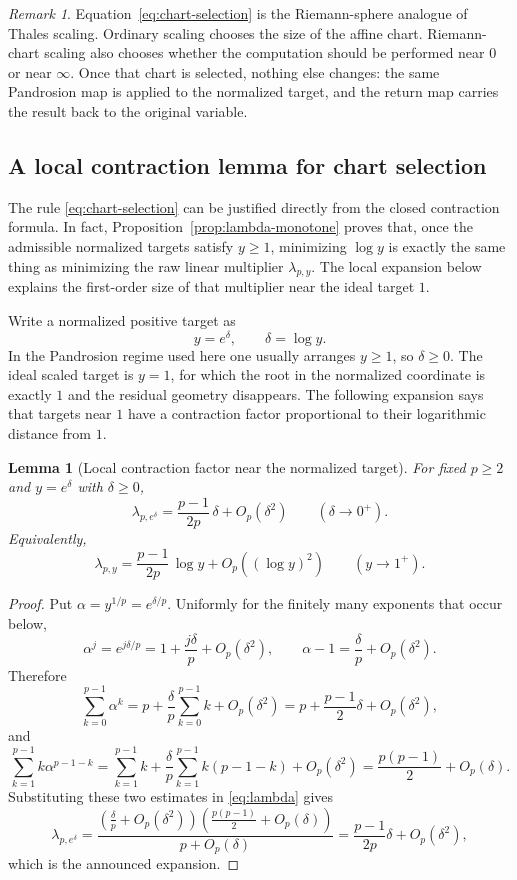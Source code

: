 \documentclass[10pt,a4paper]{article}
\theoremstyle{plain}
\newtheorem{lemma}[theorem]{Lemma}
\theoremstyle{definition}
\theoremstyle{remark}
\newtheorem{remark}[theorem]{Remark}
\begin{document}
\begin{remark}
Equation~\eqref{eq:chart-selection} is the Riemann-sphere analogue of Thales
scaling.  Ordinary scaling chooses the size of the affine chart.  Riemann-chart
scaling also chooses whether the computation should be performed near $0$ or
near $\infty$.  Once that chart is selected, nothing else changes: the same
Pandrosion map is applied to the normalized target, and the return map carries
the result back to the original variable.
\end{remark}


\subsection{A local contraction lemma for chart selection}
\label{subsec:chart-contraction-lemma}

The rule \eqref{eq:chart-selection} can be justified directly from the closed
contraction formula.  In fact, Proposition~\ref{prop:lambda-monotone} proves
that, once the admissible normalized targets satisfy $y\ge1$, minimizing
$\log y$ is exactly the same thing as minimizing the raw linear multiplier
$\lambda_{p,y}$.  The local expansion below explains the first-order size of
that multiplier near the ideal target $1$.

Write a normalized positive target as
\[
  y=e^\delta,
  \qquad \delta=\log y.
\]
In the Pandrosion regime used here one usually arranges $y\ge 1$, so
$\delta\ge0$.  The ideal scaled target is $y=1$, for which the root in the
normalized coordinate is exactly $1$ and the residual geometry disappears.
The following expansion says that targets near $1$ have a contraction factor
proportional to their logarithmic distance from $1$.

\begin{lemma}[Local contraction factor near the normalized target]
\label{lem:local-chart-contraction}
For fixed $p\ge2$ and $y=e^\delta$ with $\delta\ge0$,
\[
  \lambda_{p,e^\delta}
  =\frac{p-1}{2p}\,\delta+O_p(\delta^2)
  \qquad(\delta\to0^+).
\]
Equivalently,
\[
  \lambda_{p,y}
  =\frac{p-1}{2p}\,\log y+O_p((\log y)^2)
  \qquad(y\to1^+).
\]
\end{lemma}

\begin{proof}
Put $\alpha=y^{1/p}=e^{\delta/p}$.  Uniformly for the finitely many exponents
that occur below,
\[
  \alpha^j=e^{j\delta/p}
  =1+\frac{j\delta}{p}+O_p(\delta^2),
  \qquad
  \alpha-1=\frac{\delta}{p}+O_p(\delta^2).
\]
Therefore
\[
  \sum_{k=0}^{p-1}\alpha^k
  =p+\frac{\delta}{p}\sum_{k=0}^{p-1}k+O_p(\delta^2)
  =p+\frac{p-1}{2}\delta+O_p(\delta^2),
\]
and
\[
  \sum_{k=1}^{p-1} k\alpha^{p-1-k}
  =\sum_{k=1}^{p-1}k
   +\frac{\delta}{p}\sum_{k=1}^{p-1}k(p-1-k)
   +O_p(\delta^2)
  =\frac{p(p-1)}{2}+O_p(\delta).
\]
Substituting these two estimates in \eqref{eq:lambda} gives
\[
  \lambda_{p,e^\delta}
  =\frac{\left(\frac{\delta}{p}+O_p(\delta^2)\right)
          \left(\frac{p(p-1)}{2}+O_p(\delta)\right)}
         {p+O_p(\delta)}
  =\frac{p-1}{2p}\delta+O_p(\delta^2),
\]
which is the announced expansion.
\end{proof}
\end{document}
